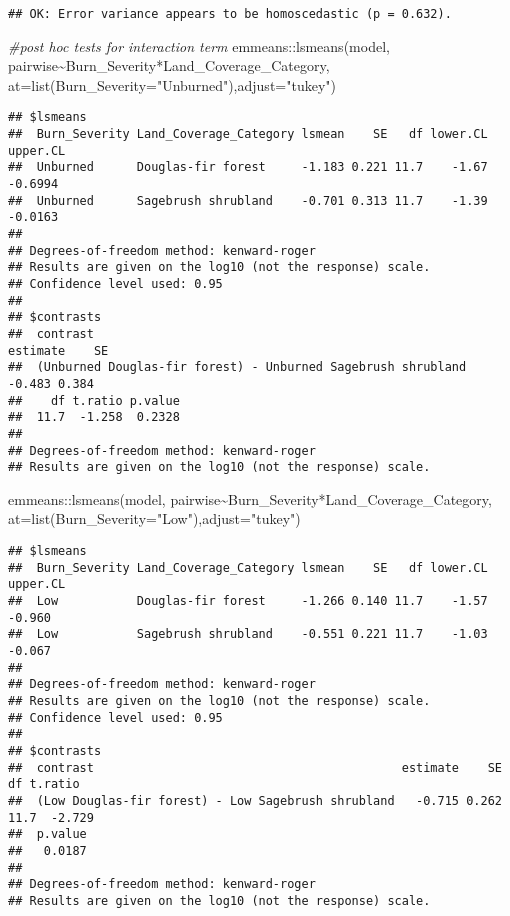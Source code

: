 \documentclass[
]{article}
\newenvironment{Shaded}{\begin{snugshade}}{\end{snugshade}}
\newcommand{\AttributeTok}[1]{\textcolor[rgb]{0.77,0.63,0.00}{#1}}
\newcommand{\CommentTok}[1]{\textcolor[rgb]{0.56,0.35,0.01}{\textit{#1}}}
\newcommand{\FunctionTok}[1]{\textcolor[rgb]{0.00,0.00,0.00}{#1}}
\newcommand{\NormalTok}[1]{#1}
\newcommand{\SpecialCharTok}[1]{\textcolor[rgb]{0.00,0.00,0.00}{#1}}
\newcommand{\StringTok}[1]{\textcolor[rgb]{0.31,0.60,0.02}{#1}}
\begin{document}
\begin{verbatim}
## OK: Error variance appears to be homoscedastic (p = 0.632).
\end{verbatim}

\begin{Shaded}
\begin{Highlighting}[]
\CommentTok{\#post hoc tests for interaction term}
\NormalTok{emmeans}\SpecialCharTok{::}\FunctionTok{lsmeans}\NormalTok{(model, pairwise}\SpecialCharTok{\textasciitilde{}}\NormalTok{Burn\_Severity}\SpecialCharTok{*}\NormalTok{Land\_Coverage\_Category, }\AttributeTok{at=}\FunctionTok{list}\NormalTok{(}\AttributeTok{Burn\_Severity=}\StringTok{"Unburned"}\NormalTok{),}\AttributeTok{adjust=}\StringTok{"tukey"}\NormalTok{)}
\end{Highlighting}
\end{Shaded}

\begin{verbatim}
## $lsmeans
##  Burn_Severity Land_Coverage_Category lsmean    SE   df lower.CL upper.CL
##  Unburned      Douglas-fir forest     -1.183 0.221 11.7    -1.67  -0.6994
##  Unburned      Sagebrush shrubland    -0.701 0.313 11.7    -1.39  -0.0163
## 
## Degrees-of-freedom method: kenward-roger 
## Results are given on the log10 (not the response) scale. 
## Confidence level used: 0.95 
## 
## $contrasts
##  contrast                                                     estimate    SE
##  (Unburned Douglas-fir forest) - Unburned Sagebrush shrubland   -0.483 0.384
##    df t.ratio p.value
##  11.7  -1.258  0.2328
## 
## Degrees-of-freedom method: kenward-roger 
## Results are given on the log10 (not the response) scale.
\end{verbatim}

\begin{Shaded}
\begin{Highlighting}[]
\NormalTok{emmeans}\SpecialCharTok{::}\FunctionTok{lsmeans}\NormalTok{(model, pairwise}\SpecialCharTok{\textasciitilde{}}\NormalTok{Burn\_Severity}\SpecialCharTok{*}\NormalTok{Land\_Coverage\_Category, }\AttributeTok{at=}\FunctionTok{list}\NormalTok{(}\AttributeTok{Burn\_Severity=}\StringTok{"Low"}\NormalTok{),}\AttributeTok{adjust=}\StringTok{"tukey"}\NormalTok{)}
\end{Highlighting}
\end{Shaded}

\begin{verbatim}
## $lsmeans
##  Burn_Severity Land_Coverage_Category lsmean    SE   df lower.CL upper.CL
##  Low           Douglas-fir forest     -1.266 0.140 11.7    -1.57   -0.960
##  Low           Sagebrush shrubland    -0.551 0.221 11.7    -1.03   -0.067
## 
## Degrees-of-freedom method: kenward-roger 
## Results are given on the log10 (not the response) scale. 
## Confidence level used: 0.95 
## 
## $contrasts
##  contrast                                           estimate    SE   df t.ratio
##  (Low Douglas-fir forest) - Low Sagebrush shrubland   -0.715 0.262 11.7  -2.729
##  p.value
##   0.0187
## 
## Degrees-of-freedom method: kenward-roger 
## Results are given on the log10 (not the response) scale.
\end{verbatim}
\end{document}
